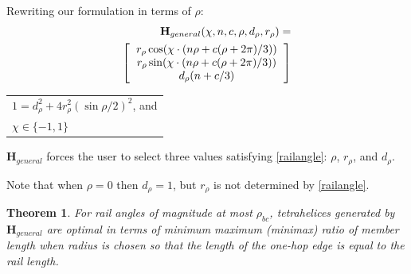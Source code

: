 \documentclass[twocolumn,10pt]{asme2ej}
\newtheorem{theorem}{Theorem}
\renewcommand{\vec}[1]{\mathbf{#1}}
\begin{document}
Rewriting our formulation in terms of $\rho$:
\begin{equation}
  \begin{split}
  \label{eq:general}  
\vec{H}_{general}(\chi,n,c,\rho,d_{\rho},r_{\rho}) = \\ 
 \left [
  \begin{tabular}{c}
   $ r_{\rho} \cos(\chi \cdot (n \rho + c(\rho +  2 \pi) /3)) $\\
   $ r_{\rho}  \sin(\chi \cdot (n \rho + c(\rho +  2 \pi) /3)) $\\
   $ d_{\rho} (n + c /3) $
  \end{tabular}
  \right ] \\
   \end{split}
\end{equation}  
\begin{tabular}{l}
  $   1 = d_{\rho}^2 + 4 r_{\rho}^2 (\sin{ \rho / 2})^2 $, and \\
    $\chi \in \{-1,1\}$ \text{.} \\  
\end{tabular}



$\vec{H}_{general}$ forces the user to select three values satisfying \cref{railangle}: $\rho$, $r_{\rho}$, and $d_{\rho}$.

Note that when $\rho = 0$ then $d_{\rho} = 1$, but $r_{\rho}$ is not determined by
\cref{railangle}.

\begin{theorem}
  \label{generalformulaoptimal}
  For rail angles of magnitude at most $\rho_{bc}$, tetrahelices generated by
  $\vec{H}_{general}$ are optimal in terms of minimum maximum (minimax) ratio of member
  length when radius is chosen so that
  the length of the one-hop edge is equal to the rail length.
\end{theorem}
\end{document}

